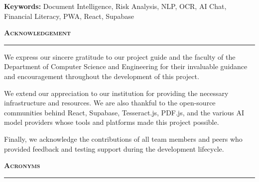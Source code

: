 \documentclass[12pt,a4paper,oneside]{report}
\newcommand{\chaptertitle}[1]{%
  \begin{center}
    \textsc{\Large\textbf{#1}}\\[2pt]
    \rule{0.5\textwidth}{0.5pt}
  \end{center}
}
\begin{document}
\vspace{0.5cm}
\noindent\textbf{Keywords:} Document Intelligence, Risk Analysis, NLP, OCR, AI Chat, Financial Literacy, PWA, React, Supabase

\newpage
\chaptertitle{Acknowledgement}

We express our sincere gratitude to our project guide and the faculty of the Department of Computer Science and Engineering for their invaluable guidance and encouragement throughout the development of this project.

We extend our appreciation to our institution for providing the necessary infrastructure and resources. We are also thankful to the open-source communities behind React, Supabase, Tesseract.js, PDF.js, and the various AI model providers whose tools and platforms made this project possible.

Finally, we acknowledge the contributions of all team members and peers who provided feedback and testing support during the development lifecycle.

\newpage
\tableofcontents

\newpage
\chaptertitle{Acronyms}
\end{document}
